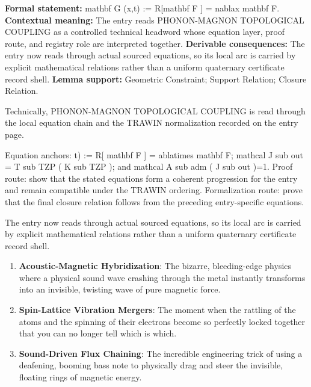\begingroup\footnotesize\setlength{\emergencystretch}{3em}\sloppy
\textbf{Formal statement:} mathbf G (x,t) := R[mathbf F ] = nablax mathbf F. \textbf{Contextual meaning:} The entry reads PHONON-MAGNON TOPOLOGICAL COUPLING as a controlled technical headword whose equation layer, proof route, and registry role are interpreted together. \textbf{Derivable consequences:} The entry now reads through actual sourced equations, so its local arc is carried by explicit mathematical relations rather than a uniform quaternary certificate record shell. \textbf{Lemma support:} Geometric Constraint; Support Relation; Closure Relation.\par
\endgroup

Technically, PHONON-MAGNON TOPOLOGICAL COUPLING is read through the local equation chain and the TRAWIN normalization recorded on the entry page.

Equation anchors: t) := R[ mathbf F ] = ablatimes mathbf F; mathcal J sub out = T sub TZP ( K sub TZP ); and mathcal A sub adm ( J sub out )=1. Proof route: show that the stated equations form a coherent progression for the entry and remain compatible under the TRAWIN ordering. Formalization route: prove that the final closure relation follows from the preceding entry-specific equations.

The entry now reads through actual sourced equations, so its local arc is carried by explicit mathematical relations rather than a uniform quaternary certificate record shell.
\endgroup

\begin{enumerate}[leftmargin=1.6em,itemsep=6pt,topsep=4pt]
\item \textbf{Acoustic-Magnetic Hybridization}: The bizarre, bleeding-edge physics where a physical sound wave crashing through the metal instantly transforms into an invisible, twisting wave of pure magnetic force.
\item \textbf{Spin-Lattice Vibration Mergers}: The moment when the rattling of the atoms and the spinning of their electrons become so perfectly locked together that you can no longer tell which is which.
\item \textbf{Sound-Driven Flux Chaining}: The incredible engineering trick of using a deafening, booming bass note to physically drag and steer the invisible, floating rings of magnetic energy.
\end{enumerate}

